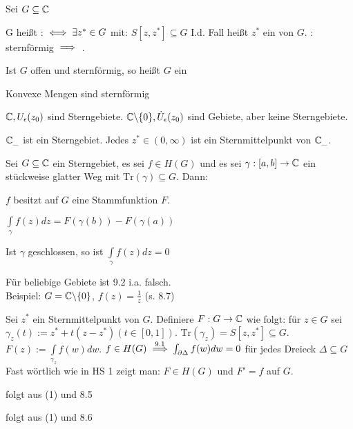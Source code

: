 \documentclass[a4paper,twoside,DIV15,BCOR12mm]{scrbook}
\def\gdw{\equizu}
\def\Tr{\text{Tr}}
\def\wegint{\ensuremath{\int\limits_\gamma}}
\def\gdw{\equizu}
\begin{document}
\begin{definition}
Sei $G \subseteq \mathbb{C}$
\begin{liste}
\item G heißt  : $\gdw \exists z^* \in G$ mit: $S[z,z^*] \subseteq G$
I.d. Fall heißt $z^*$ ein  von $G$.\newline
{}: sternförmig $\implies$ .
\item Ist $G$ offen und sternförmig, so heißt $G$ ein 
\end{liste}
\end{definition}

\begin{beispiel}
\begin{liste}
\item Konvexe Mengen sind sternförmig
\item $\mathbb{C}, U_{\epsilon}(z_0)$ sind Sterngebiete. $\mathbb{C}\backslash\{0\}, \dot U_{\epsilon}(z_0)$ sind Gebiete, aber keine Sterngebiete.
\item $\mathbb{C}_{\_}$ ist ein Sterngebiet. Jedes $z^* \in (0,\infty)$ ist ein Sternmittelpunkt von $\mathbb{C}_{\_}$.
\end{liste}
\end{beispiel}
\begin{satz}
Sei $G \subseteq \mathbb{C}$ ein Sterngebiet, es sei $f \in H(G)$ und es sei $\gamma:[a,b] \rightarrow \mathbb{C}$ ein stückweise glatter Weg mit $\Tr (\gamma) \subseteq G$. Dann:
\begin{liste}
\item $f$ besitzt auf $G$ eine Stammfunktion $F$.
\item $\wegint f(z) dz = F(\gamma(b))-F(\gamma(a))$
\item Ist $\gamma$ geschlossen, so ist $\wegint f(z) dz = 0$
\end{liste}
\end{satz}
\begin{bemerkung}
Für beliebige Gebiete ist 9.2 i.a. falsch. \\
Beispiel: $G = \mathbb{C}\backslash\{0\}$, $f(z) = \frac{1}{z}$ (s. 8.7)
\end{bemerkung}

\begin{beweis}
\begin{liste}
\item Sei $z^*$ ein Sternmittelpunkt von $G$. Definiere $F : G \to \mathbb{C}$ wie folgt:
für $z \in G$ sei $\gamma_z (t) := z^* + t (z-z^*) (t \in [0,1])$.
$\Tr(\gamma_z) = S[z,z^*] \subseteq G$. $F(z) := \int\limits_{\gamma _z} f(w) dw$.
$f \in H(G) \stackrel{9.1}{\implies} \int_{\partial \Delta} f(w) dw = 0$ für jedes Dreieck $\Delta \subseteq G$
Fast wörtlich wie in HS 1 zeigt man: $F \in H(G)$ und $F'=f$ auf $G$.
\item folgt aus (1) und 8.5
\item folgt aus (1) und 8.6
\end{liste}
\end{beweis}
\end{document}

